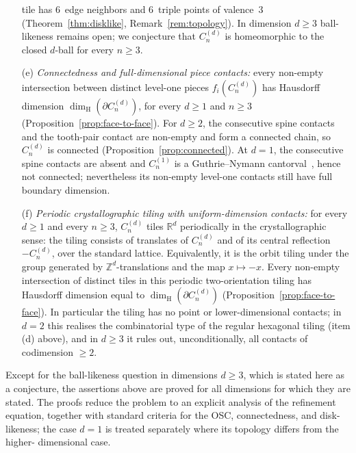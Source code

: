 \documentclass{amsart}
\theoremstyle{definition}
\theoremstyle{remark}
\newcommand{\R}{\mathbb{R}}
\newcommand{\Z}{\mathbb{Z}}
\newcommand{\dH}{\dim_{\mathrm{H}}}
\begin{document}
\begin{itemize}
  tile has $6$~edge neighbors and $6$~triple points of valence~$3$
  (Theorem~\ref{thm:disklike}, Remark~\ref{rem:topology}).  In
  dimension $d \ge 3$ ball-likeness remains open; we conjecture
  that $C_n^{(d)}$ is homeomorphic to the closed $d$-ball for
  every $n \ge 3$.
\item[(e)] \emph{Connectedness and full-dimensional piece contacts:}
  every non-empty intersection between distinct level-one pieces
  $f_i(C_n^{(d)})$ has Hausdorff dimension
  $\dH(\partial C_n^{(d)})$, for every $d \ge 1$ and $n \ge 3$
  (Proposition~\ref{prop:face-to-face}).  For $d \ge 2$, the
  consecutive spine contacts and the tooth-pair contact are non-empty
  and form a connected chain, so $C_n^{(d)}$ is connected
  (Proposition~\ref{prop:connected}).  At $d = 1$, the consecutive
  spine contacts are absent and $C_n^{(1)}$ is a Guthrie--Nymann
  cantorval~\cite{guthrie-nymann}, hence not connected; nevertheless
  its non-empty level-one contacts still have full boundary dimension.
\item[(f)] \emph{Periodic crystallographic tiling with
  uniform-dimension contacts:} for every $d \ge 1$ and every
  $n \ge 3$, $C_n^{(d)}$ tiles $\R^d$ periodically in the
  crystallographic sense: the tiling consists of translates of
  $C_n^{(d)}$ and of its central reflection $-C_n^{(d)}$, over the
  standard lattice.  Equivalently, it is the orbit tiling under the
  group generated by $\Z^d$-translations and the map $x\mapsto -x$.
  Every non-empty intersection of distinct tiles in this periodic
  two-orientation tiling has Hausdorff dimension equal to
  $\dH(\partial C_n^{(d)})$
  (Proposition~\ref{prop:face-to-face}).  In particular the
  tiling has no point or lower-dimensional contacts; in $d = 2$
  this realises the combinatorial type of the regular hexagonal
  tiling \textup{(}item (d) above\textup{)}, and in $d \ge 3$ it
  rules out, unconditionally, all contacts of codimension
  $\ge 2$.
\end{itemize}
Except for the ball-likeness question in dimensions $d \ge 3$, which
is stated here as a conjecture, the assertions above are proved for all
dimensions for which they are stated.  The proofs reduce the problem to
an explicit analysis of the refinement equation, together with standard
criteria for the OSC, connectedness, and disk-likeness; the case $d=1$
is treated separately where its topology differs from the higher-
dimensional case.
\end{document}
